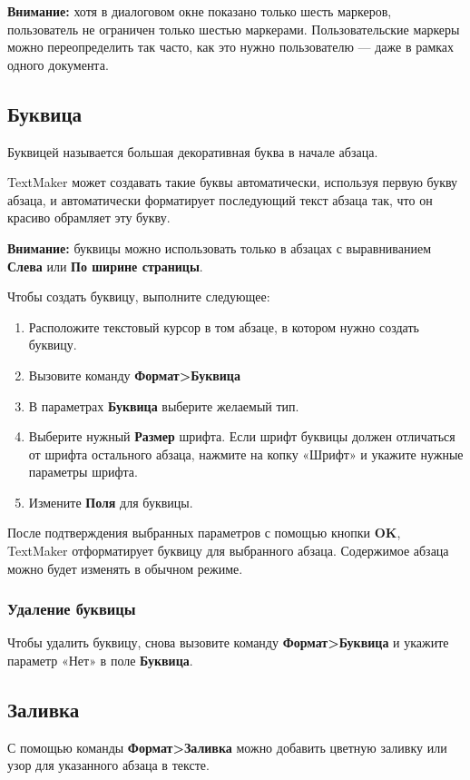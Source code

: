 \documentclass[a4paper,10pt]{article}
\begin{document}
\begin{mdframed}[backgroundcolor=blue!10]
\textbf{Внимание:} хотя в диалоговом окне показано только шесть маркеров, пользователь не ограничен только шестью маркерами. Пользовательские маркеры можно переопределить так часто, как это нужно пользователю --- даже в рамках одного документа.
\end{mdframed}

\subsection{Буквица}
Буквицей называется большая декоративная буква в начале абзаца.

TextMaker может создавать такие буквы автоматически, используя первую букву абзаца, и автоматически форматирует последующий текст абзаца так, что он красиво обрамляет эту букву.
\begin{mdframed}[backgroundcolor=blue!10]
\textbf{Внимание:} буквицы можно использовать только в абзацах с выравниванием \textbf{Слева} или \textbf{По ширине страницы}.
\end{mdframed}

Чтобы создать буквицу, выполните следующее:
\begin{enumerate}
 \item Расположите текстовый курсор в том абзаце, в котором нужно создать буквицу.
 \item Вызовите команду \textbf{Формат>Буквица}
 \item В параметрах \textbf{Буквица} выберите желаемый тип.
 \item Выберите нужный \textbf{Размер} шрифта. Если шрифт буквицы должен отличаться от шрифта остального абзаца, нажмите на копку «Шрифт» и укажите нужные параметры шрифта.
 \item Измените \textbf{Поля} для буквицы.
\end{enumerate}

После подтверждения выбранных параметров с помощью кнопки \textbf{OK}, TextMaker отформатирует буквицу для выбранного абзаца. Содержимое абзаца можно будет изменять в обычном режиме.

\subsubsection{Удаление буквицы}
Чтобы удалить буквицу, снова вызовите команду \textbf{Формат>Буквица} и укажите параметр «Нет» в поле \textbf{Буквица}. 

\subsection{Заливка}
С помощью команды \textbf{Формат>Заливка} можно добавить цветную заливку или узор для указанного абзаца в тексте.
\end{document}

